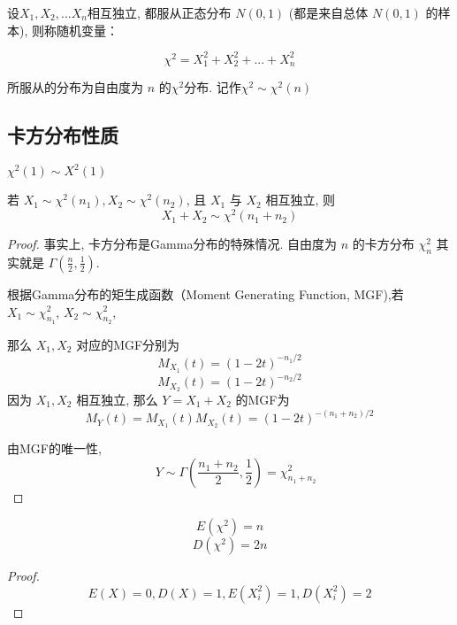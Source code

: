 \begin{definition}[卡方分布]
    设$X_1,X_2,...X_n$相互独立, 都服从正态分布 $N(0,1)$ (都是来自总体 $N(0,1)$ 的样本), 则称随机变量：

    $$
        \chi^2 = X_1^2 + X_2^2 + ... + X_n^2
    $$

    所服从的分布为自由度为 $n$ 的$\chi^2$分布. 记作$\chi^2 \sim \chi^2(n)$
\end{definition}

\subsection{卡方分布性质}

\begin{corollary}
    $\chi^2(1) \sim X^2(1)$
\end{corollary}

\begin{corollary}
    若 $ X_{1} \sim \chi^{2}\left(n_{1}\right), X_{2} \sim \chi^{2}\left(n_{2}\right) $, 且 $ X_{1} $ 与 $ X_{2} $ 相互独立, 则
    $$
        X_{1}+X_{2} \sim \chi^{2}\left(n_{1}+n_{2}\right)
    $$
\end{corollary}

\begin{proof}
    事实上, 卡方分布是Gamma分布的特殊情况. 自由度为 $ n $ 的卡方分布 $ \chi_{n}^{2} $ 其实就是 $ \Gamma\left(\frac{n}{2}, \frac{1}{2}\right) $.

    根据Gamma分布的矩生成函数（Moment Generating Function, MGF),若$ X_{1} \sim \chi_{n_{1}}^{2} $, $ X_{2} \sim \chi_{n_{2}}^{2} $,

    那么 $ X_{1}, X_{2} $ 对应的MGF分别为
    $$ M_{X_{1}}(t)=(1-2 t)^{-n_{1} / 2} $$
    $$ M_{X_{2}}(t)=(1-2 t)^{-n_{2} / 2} $$
    因为 $ X_{1}, X_{2} $ 相互独立, 那么 $ Y=X_{1}+X_{2} $ 的MGF为
    $$ M_{Y}(t)=M_{X_{1}}(t) M_{X_{2}}(t)=(1-2 t)^{-\left(n_{1}+n_{2}\right) / 2} $$

    由MGF的唯一性,
    $$ \quad Y \sim \Gamma\left(\frac{n_{1}+n_{2}}{2}, \frac{1}{2}\right)=\chi_{n_{1}+n_{2}}^{2} $$
\end{proof}

\begin{corollary}
    $$E(\chi^2) = n$$
    $$D(\chi^2) = 2n$$
\end{corollary}

\begin{proof}
    $$
        E(X) = 0,
        D(X) = 1,
        E(X_i^2) = 1,
        D(X_i^2) = 2
    $$
\end{proof}

